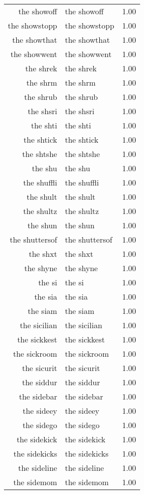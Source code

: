 \begin{table}[ht]
\begin{tabular}{rlr}
  the showoff & the showoff & 1.00 \\ 
  the showstopp & the showstopp & 1.00 \\ 
  the showthat & the showthat & 1.00 \\ 
  the showwent & the showwent & 1.00 \\ 
  the shrek & the shrek & 1.00 \\ 
  the shrm & the shrm & 1.00 \\ 
  the shrub & the shrub & 1.00 \\ 
  the shsri & the shsri & 1.00 \\ 
  the shti & the shti & 1.00 \\ 
  the shtick & the shtick & 1.00 \\ 
  the shtshe & the shtshe & 1.00 \\ 
  the shu & the shu & 1.00 \\ 
  the shuffli & the shuffli & 1.00 \\ 
  the shult & the shult & 1.00 \\ 
  the shultz & the shultz & 1.00 \\ 
  the shun & the shun & 1.00 \\ 
  the shuttersof & the shuttersof & 1.00 \\ 
  the shxt & the shxt & 1.00 \\ 
  the shyne & the shyne & 1.00 \\ 
  the si & the si & 1.00 \\ 
  the sia & the sia & 1.00 \\ 
  the siam & the siam & 1.00 \\ 
  the sicilian & the sicilian & 1.00 \\ 
  the sickkest & the sickkest & 1.00 \\ 
  the sickroom & the sickroom & 1.00 \\ 
  the sicurit & the sicurit & 1.00 \\ 
  the siddur & the siddur & 1.00 \\ 
  the sidebar & the sidebar & 1.00 \\ 
  the sideey & the sideey & 1.00 \\ 
  the sidego & the sidego & 1.00 \\ 
  the sidekick & the sidekick & 1.00 \\ 
  the sidekicks & the sidekicks & 1.00 \\ 
  the sideline & the sideline & 1.00 \\ 
  the sidemom & the sidemom & 1.00 \\ 

\end{tabular}
\end{table}
